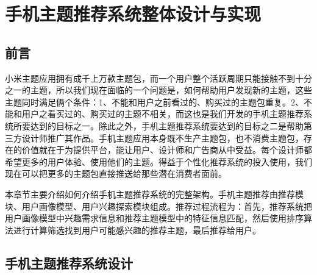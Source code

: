 
\chapter{手机主题推荐系统整体设计与实现}
    \section{前言}
    小米主题应用拥有成千上万款主题包，而一个用户整个活跃周期只能接触不到十分之一的主题，所以我们现在面临的一个问题是，如何帮助用户发现新的主题，这些主题同时满足俩个条件：1、不能和用户之前看过的、购买过的主题包重复。2、不能和用户之看买过的、购买过的主题不相关，而这也是我们开发的手机主题推荐系统所要达到的目标之一。除此之外，手机主题推荐系统要达到的目标之二是帮助第三方设计师推广其作品。手机主题应用本身既不生产主题包，也不消费主题包，存在的价值就在于为提供平台，能让用户、设计师和广告商从中受益。每个设计师都希望更多的用户体验、使用他们的主题。得益于个性化推荐系统的投入使用，我们现在可以把更多的主题包直接推送给那些潜在消费者面前。

    本章节主要介绍如何介绍手机主题推荐系统的完整架构。手机主题推荐由推荐模块、用户画像模型、用户兴趣探索模块组成。推荐过程流程为：首先，推荐系统把用户画像模型中兴趣需求信息和推荐主题模型中的特征信息匹配，然后使用排序算法进行计算筛选找到用户可能感兴趣的推荐主题，最后推荐给用户。
    \section{手机主题推荐系统设计}
    
    \begin{figure}
      \centering
        \label{pic:construct}
    \end{figure}

